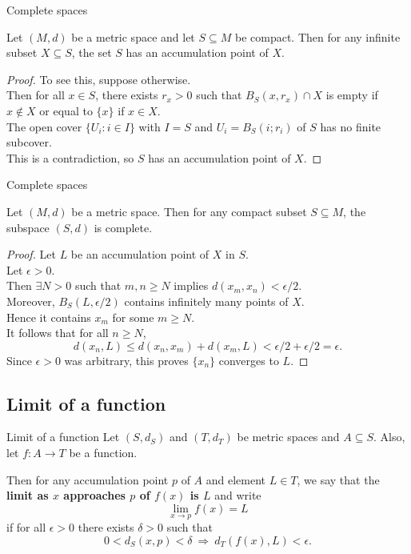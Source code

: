\documentclass{beamer}
\begin{document}
\begin{frame}{Complete spaces}
\begin{lem}
Let $(M,d)$ be a metric space and let $S\subseteq M$ be compact.
\pause
Then for any infinite subset $X\subseteq S$, the set $S$ has an accumulation point of $X$.
\end{lem}
\pause
\begin{proof}
\pause
To see this, suppose otherwise.\\
\pause
Then for all $x\in S$, there exists $r_x > 0$ such that $B_S(x,r_x)\cap X$ is empty if $x\notin X$ or equal to $\{x\}$ if $x\in X$.\\
\pause
The open cover $\{U_i: i\in I\}$ with $I=S$ and $U_i = B_S(i; r_i)$ of $S$ has no finite subcover.\\
\pause
This is a contradiction, so $S$ has an accumulation point of $X$.
\end{proof}
\end{frame}

\begin{frame}{Complete spaces}
\begin{thm}
Let $(M,d)$ be a metric space.
Then for any compact subset $S\subseteq M$, the subspace $(S,d)$ is complete.
\end{thm}
\begin{proof}
\pause
Let $L$ be an accumulation point of $X$ in $S$.\\
\pause
Let $\epsilon > 0$.\\
\pause
Then $\exists N>0$ such that $m,n \geq N$ implies $d(x_m,x_n) < \epsilon/2$.\\
\pause
Moreover, $B_S(L,\epsilon/2)$ contains infinitely many points of $X$.\\
\pause
Hence it contains $x_m$ for some $m\geq N$.\\
\pause
It follows that for all $n\geq N$,
$$d(x_n,L)\leq d(x_n,x_m) + d(x_m,L) < \epsilon/2 + \epsilon/2 = \epsilon.$$
\pause
Since $\epsilon > 0$ was arbitrary, this proves $\{x_n\}$ converges to $L$.
\end{proof}
\end{frame}



\subsection{Limit of a function}

\begin{frame}{Limit of a function}
Let $(S,d_S)$ and $(T,d_T)$ be metric spaces and $A\subseteq S$.
\pause
Also, let $f: A\rightarrow T$ be a function.
\pause
\begin{defn}
\pause
Then for any accumulation point $p$ of $A$ and element $L\in T$, we say that the \textbf{limit as $x$ approaches $p$ of $f(x)$ is $L$}
\pause
 and write
$$\lim_{x\rightarrow p} f(x) = L$$
\pause
if for all $\epsilon > 0$ there exists $\delta > 0$ such that
$$0 < d_S(x,p) < \delta\ \Rightarrow\ d_T(f(x),L) < \epsilon.$$
\end{defn}
\end{frame}
\end{document}
